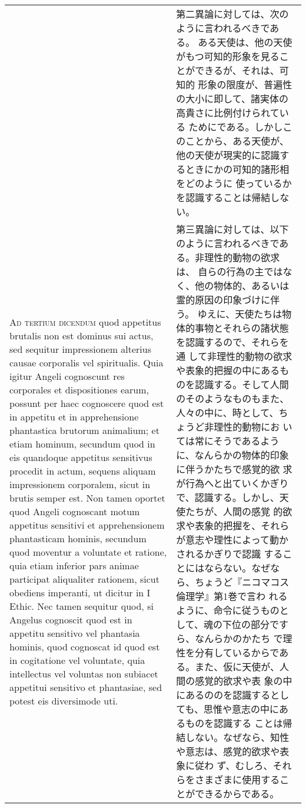 \documentclass[10pt]{jsarticle} %
\begin{document}
\begin{longtable}{p{21em}p{21em}}
&

第二異論に対しては、次のように言われるべきである。
ある天使は、他の天使がもつ可知的形象を見ることができるが、それは、可知的
 形象の限度が、普遍性の大小に即して、諸実体の高貴さに比例付けられている
 ためにである。しかしこのことから、ある天使が、他の天使が現実的に認識するときにかの可知的諸形相をどのように
 使っているかを認識することは帰結しない。


\\



{\scshape Ad tertium dicendum} quod appetitus brutalis
 non est dominus sui actus, sed sequitur impressionem alterius causae
 corporalis vel spiritualis. Quia igitur Angeli cognoscunt res
 corporales et dispositiones earum, possunt per haec cognoscere quod est
 in appetitu et in apprehensione phantastica brutorum animalium; et
 etiam hominum, secundum quod in eis quandoque appetitus sensitivus
 procedit in actum, sequens aliquam impressionem corporalem, sicut in
 brutis semper est. Non tamen oportet quod Angeli cognoscant motum
 appetitus sensitivi et apprehensionem phantasticam hominis, secundum
 quod moventur a voluntate et ratione, quia etiam inferior pars animae
 participat aliqualiter rationem, sicut obediens imperanti, ut dicitur
 in I Ethic. Nec tamen sequitur quod, si Angelus cognoscit quod est in
 appetitu sensitivo vel phantasia hominis, quod cognoscat id quod est in
 cogitatione vel voluntate, quia intellectus vel voluntas non subiacet
 appetitui sensitivo et phantasiae, sed potest eis diversimode uti.
 
&

第三異論に対しては、以下のように言われるべきである。非理性的動物の欲求は、
 自らの行為の主ではなく、他の物体的、あるいは霊的原因の印象づけに伴う。
 ゆえに、天使たちは物体的事物とそれらの諸状態を認識するので、それらを通
 して非理性的動物の欲求や表象的把握の中にあるものを認識する。そして人間
 のそのようなものもまた、人々の中に、時として、ちょうど非理性的動物にお
 いては常にそうであるように、なんらかの物体的印象に伴うかたちで感覚的欲
 求が行為へと出ていくかぎりで、認識する。しかし、天使たちが、人間の感覚
 的欲求や表象的把握を、それらが意志や理性によって動かされるかぎりで認識
 することにはならない。なぜなら、ちょうど『ニコマコス倫理学』第1巻で言わ
 れるように、命令に従うものとして、魂の下位の部分ですら、なんらかのかたち
 で理性を分有しているからである。また、仮に天使が、人間の感覚的欲求や表
 象の中にあるののを認識するとしても、思惟や意志の中にあるものを認識する
 ことは帰結しない。なぜなら、知性や意志は、感覚的欲求や表象に従わ
 ず、むしろ、それらをさまざまに使用することができるからである。

\\

 
\end{longtable}
\newpage
\end{document}
